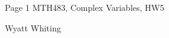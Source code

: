 \documentclass{article}
\begin{document}
\large %


{\Large Page 1 %
\hfill  MTH483, Complex Variables, HW5}

\begin{center}
{\Large Wyatt Whiting}
\end{center}
\vspace{0.05in}

\end{document}
